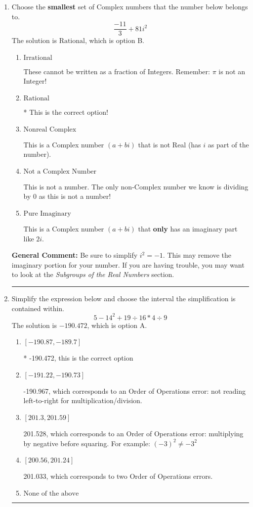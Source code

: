 \documentclass{extbook}[14pt]
\newcommand{\litem}[1]{\item #1

\rule{\textwidth}{0.4pt}}
\begin{document}
\begin{enumerate}\litem{
Choose the \textbf{smallest} set of Complex numbers that the number below belongs to.
\[ \frac{-11}{3}+81i^2 \]The solution is \( \text{Rational} \), which is option B.\begin{enumerate}[label=\Alph*.]
\item \( \text{Irrational} \)

These cannot be written as a fraction of Integers. Remember: $\pi$ is not an Integer!
\item \( \text{Rational} \)

* This is the correct option!
\item \( \text{Nonreal Complex} \)

This is a Complex number $(a+bi)$ that is not Real (has $i$ as part of the number).
\item \( \text{Not a Complex Number} \)

This is not a number. The only non-Complex number we know is dividing by 0 as this is not a number!
\item \( \text{Pure Imaginary} \)

This is a Complex number $(a+bi)$ that \textbf{only} has an imaginary part like $2i$.
\end{enumerate}

\textbf{General Comment:} Be sure to simplify $i^2 = -1$. This may remove the imaginary portion for your number. If you are having trouble, you may want to look at the \textit{Subgroups of the Real Numbers} section.
}
\litem{
Simplify the expression below and choose the interval the simplification is contained within.
\[ 5 - 14^2 + 19 \div 16 * 4 \div 9 \]The solution is \( -190.472 \), which is option A.\begin{enumerate}[label=\Alph*.]
\item \( [-190.87, -189.7] \)

* -190.472, this is the correct option
\item \( [-191.22, -190.73] \)

 -190.967, which corresponds to an Order of Operations error: not reading left-to-right for multiplication/division.
\item \( [201.3, 201.59] \)

 201.528, which corresponds to an Order of Operations error: multiplying by negative before squaring. For example: $(-3)^2 \neq -3^2$
\item \( [200.56, 201.24] \)

 201.033, which corresponds to two Order of Operations errors.
\item \( \text{None of the above} \)


\end{enumerate}}
\end{enumerate}
\end{document}
